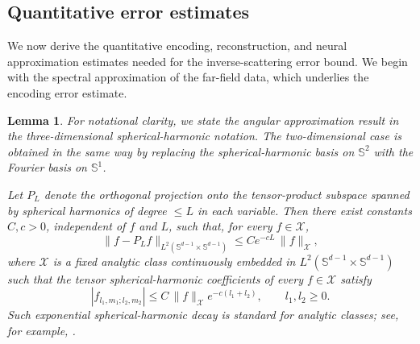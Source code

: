 \documentclass{article}
\numberwithin{equation}{section}
\theoremstyle{plain}
\newtheorem{lemma}{Lemma}[section]
\begin{document}
	\subsection{Quantitative error estimates}
	We now derive the quantitative encoding, reconstruction, and neural approximation estimates needed for the inverse-scattering error bound. We begin with the spectral approximation of the far-field data, which underlies the encoding error estimate.
		\begin{lemma}
		\label{lem:sph-harm-approx}
		For notational clarity, we state the angular approximation result in the
		three-dimensional spherical-harmonic notation.  The two-dimensional case is
		obtained in the same way by replacing the spherical-harmonic basis on
		$\mathbb S^2$ with the Fourier basis on
		$\mathbb S^1$.
		
		Let $P_L$ denote the orthogonal projection onto the tensor-product subspace spanned by spherical harmonics of degree $\le L$ in each variable.
		Then there exist constants $C,c>0$, independent of $f$ and $L$, such that, for every $f\in\mathcal X$,
		\begin{equation*}
			\|f-P_L f\|_{L^2(\mathbb{S}^{d-1}\times\mathbb{S}^{d-1})}
			\le Ce^{-cL}\,\|f\|_{\mathcal X},
		\end{equation*}
		where $\mathcal X$ is a fixed analytic class continuously embedded in $L^2(\mathbb S^{d-1}\times\mathbb S^{d-1})$ such that the tensor spherical-harmonic coefficients of every $f\in\mathcal X$ satisfy
		\begin{equation*}
			|\hat f_{l_1,m_1;l_2,m_2}|
			\le C\,\|f\|_{\mathcal X}e^{-c(l_1+l_2)},
			\qquad l_1,l_2\ge0.
		\end{equation*}
		Such exponential spherical-harmonic decay is standard for analytic
		classes; see, for example, \cite{VV18}.
	\end{lemma}
	
\end{document}
